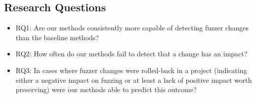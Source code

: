 \subsection{Research Questions}

\begin{itemize}
\item {RQ1:  Are our methods consistently more capable of detecting
    fuzzer changes than the baseline methods?}
\item {RQ2:}  How often do our methods fail to detect that a change has
    an impact?
  \item {RQ3:} In cases where fuzzer changes were rolled-back in a
    project (indicating either a negative impact on fuzzing or at
    least a lack of positive impact worth preserving) were our methods
    able to predict this outcome?
  \end{itemize}
